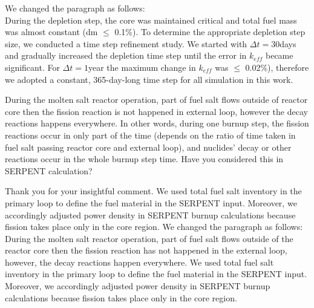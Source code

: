 \documentclass[answers,11pt]{exam}
\begin{document}
\begin{questions}
\begin{solution}
        		  We changed the paragraph as follows:\\
        		  During the depletion step, the core was maintained critical and total fuel mass was almost constant (dm $\leq$ 0.1\%). To determine the appropriate depletion step size, we conducted a time step refinement study. We started with $\Delta t=30$days and gradually increased the depletion time step until the error in $k_{eff}$ became significant. For $\Delta t=1$year the maximum change in $k_{eff}$ was $\leq$ 0.02\%), therefore we adopted a constant, 365-day-long time step for all simulation in this work.
        		    
        \end{solution}

        \question During the molten salt reactor operation, part of fuel salt flows outside of reactor core then the fission reaction is not happened in external loop, however the decay reactions happens everywhere. In other words, during one burnup step, the fission reactions occur in only part of the time (depends on the ratio of time taken in fuel salt passing reactor core and external loop), and nuclides' decay or other reactions occur in the whole burnup step time. Have you considered this in SERPENT calculation?  
        \begin{solution}
		          
		          Thank you for your insightful comment. We used total fuel 
		          salt inventory in the primary loop to define the fuel 
		          material in the SERPENT input. Moreover, we accordingly 
		          adjusted power density in SERPENT burnup calculations 
		          because fission takes place only in the core region.
		          We changed the paragraph as follows:\\    
		          
		          During the molten salt reactor operation, part of fuel salt flows outside of the reactor core then the fission reaction has not happened in the external loop, however, the decay reactions happen everywhere. We used total fuel salt inventory in the primary loop to define the fuel material in the SERPENT input. Moreover, we accordingly adjusted power density in SERPENT burnup calculations because fission takes place only in the core region.     
        \end{solution}

	

\end{questions}
\end{document}
